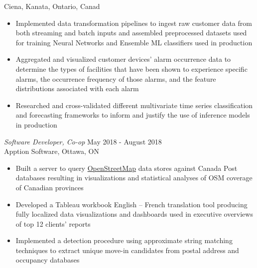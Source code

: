 \documentclass[margin]{res}
\begin{document}
\begin{resume}
Ciena, Kanata, Ontario, Canad
\begin{itemize}  \itemsep -2pt %
\item Implemented data transformation pipelines to ingest raw
      customer data from both streaming and batch inputs and 
      assembled preprocessed datasets used for training Neural Networks
      and Ensemble ML classifiers used in production
\item Aggregated and visualized customer devices' alarm occurrence data
      to determine the types
      of facilities that have been shown to experience specific alarms,
      the occurrence frequency of those alarms, and the feature distributions associated with each alarm
\item Researched and cross-validated different multivariate time series classification and forecasting frameworks to inform and justify the use of inference models in production
\end{itemize}
\clearpage
{\sl Software Developer, Co-op} \hfill            May 2018 - August 2018\\
Apption Software, Ottawa, ON 
\begin{itemize}  \itemsep -2pt %
\item Built a server to query \href{https://www.openstreetmap.org/}{OpenStreetMap} data stores
      against Canada Post databases resulting in visualizations and statistical analyses of OSM
      coverage of Canadian provinces
\item Developed a Tableau workbook English – French translation tool producing fully
      localized data visualizations and dashboards used in executive overviews of top 12
      clients’ reports 
\item Implemented a detection procedure using approximate string matching techniques to extract
      unique move-in candidates from postal address and occupancy databases 
\end{itemize}



\end{resume}
\end{document}
